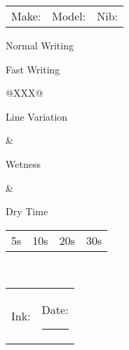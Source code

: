 \documentclass[letterpaper,12pt]{memoir}
\begin{document}
\begin{tabularx}{\textwidth}{@{}XXX@{}}
Make: \textcolor{lightgray}{\hrulefill} & Model: \textcolor{lightgray}{\hrulefill} & Nib: \textcolor{lightgray}{\hrulefill}
\end{tabularx}

\begin{prettyframed}{Normal Writing}
  \vspace{0.75in}
\end{prettyframed}

\begin{prettyframed}{Fast Writing}
  \vspace{0.75in}
\end{prettyframed}

\begin{tabularx}{\textwidth}{@{}XXX@{}}
  \begin{prettyframed}{Line Variation}
    \begin{minipage}[t][1.5in][t]{\textwidth}
      \begin{vplace}[0.2]
      \end{vplace}
    \end{minipage}
  \end{prettyframed} &
                       \begin{prettyframed}{Wetness}
                         \begin{minipage}[t][1.5in][t]{\textwidth}

                         \end{minipage}
                       \end{prettyframed} &
                                            \begin{prettyframed}{Dry Time}
                                              \begin{minipage}[t][1.5in][t]{\textwidth}
                                                {\begin{tabularx}{\textwidth}{cXXX}
                                                   5s & 10s & 20s & 30s
                                                 \end{tabularx}}
                                              \end{minipage}
                                            \end{prettyframed} \\
\end{tabularx}

\vspace{\fill}

\begin{tabularx}{\textwidth}{@{}X r@{}}
Ink: \hrulefill & Date: \rule{5cm}{0.4pt}
\end{tabularx}
\end{document}
